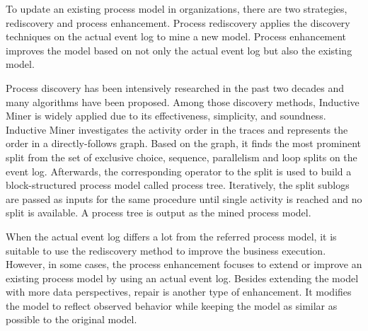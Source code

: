 To update an existing process model in organizations, there are two strategies, rediscovery and process enhancement. Process rediscovery applies the discovery techniques on the actual event log to mine a new model. Process enhancement improves the model based on not only the actual event log but also the existing model. 



Process discovery has been intensively researched in the past two decades and many algorithms have been proposed\cite{van2016data}.  Among those discovery methods, Inductive Miner is widely applied due to its effectiveness, simplicity, and soundness\cite{leemans2013discovering}. Inductive Miner investigates the activity order in the traces and represents the order in a directly-follows graph. Based on the graph, it finds the most prominent split from the set of exclusive choice, sequence, parallelism and loop splits on the event log.  Afterwards, the corresponding operator to the split is used to build a block-structured process model called process tree. Iteratively, the  split sublogs are passed as inputs for the same procedure until single activity is reached and no split is available. A process tree is output as the mined process model.

When the actual event log differs a lot from the referred process model, it is suitable to use the rediscovery method to improve the business execution. However, in some cases, the process enhancement focuses to extend or improve an existing process model by using an actual event log\cite{van2011process}. Besides extending the model with more data perspectives, repair is another type of enhancement. It modifies the model to reflect observed behavior while keeping the model as similar as possible to the original model.

